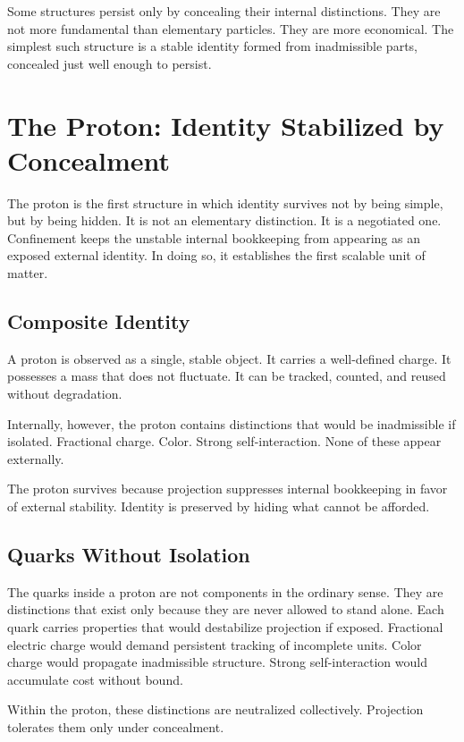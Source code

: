 \documentclass[11pt,twoside,openright]{book}
\begin{document}
Some structures persist only by concealing their internal distinctions. They are not more fundamental than elementary particles. They are more economical. The simplest such structure is a stable identity formed from inadmissible parts, concealed just well enough to persist.

\chapter{The Proton: Identity Stabilized by Concealment}

The proton is the first structure in which identity survives not by being simple, but by being hidden. It is not an elementary distinction. It is a negotiated one. Confinement keeps the unstable internal bookkeeping from appearing as an exposed external identity. In doing so, it establishes the first scalable unit of matter.

\section*{Composite Identity}

A proton is observed as a single, stable object. It carries a well-defined charge. It possesses a mass that does not fluctuate. It can be tracked, counted, and reused without degradation.

Internally, however, the proton contains distinctions that would be inadmissible if isolated. Fractional charge. Color. Strong self-interaction. None of these appear externally.

The proton survives because projection suppresses internal bookkeeping in favor of external stability. Identity is preserved by hiding what cannot be afforded.

\section*{Quarks Without Isolation}

The quarks inside a proton are not components in the ordinary sense. They are distinctions that exist only because they are never allowed to stand alone. Each quark carries properties that would destabilize projection if exposed. Fractional electric charge would demand persistent tracking of incomplete units. Color charge would propagate inadmissible structure. Strong self-interaction would accumulate cost without bound.

Within the proton, these distinctions are neutralized collectively. Projection tolerates them only under concealment.
\end{document}
